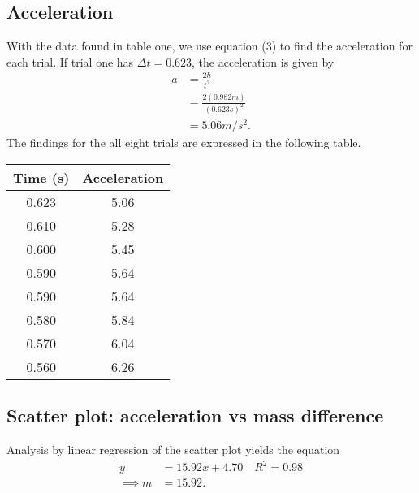 \documentclass{report}
\begin{document}
    \subsection{Acceleration}
    \bigbreak \noindent 
    With the data found in table one, we use equation (3) to find the acceleration for each trial. If trial one has $\Delta t = 0.623$, the acceleration is given by
    \begin{align*}
        a &= \frac{2h}{t^{2}} \\
        &=\frac{2(0.982m)}{(0.623s)^{2}} \\
        &=5.06m/s^{2}
    .\end{align*}
    \bigbreak \noindent 
    The findings for the all eight trials are expressed in the following table.
    \begin{center}
        \begin{tabular}{c|c}
            Time (s) & Acceleration \\
        \hline
            0.623  & 5.06\\
            0.610  & 5.28\\
            0.600  & 5.45\\
            0.590  & 5.64\\
            0.590  & 5.64\\
            0.580  & 5.84\\
            0.570  & 6.04\\
            0.560  & 6.26\\
        \end{tabular}
    \end{center}

    \bigbreak \noindent 
    \subsection{Scatter plot: acceleration vs mass difference}
    \bigbreak \noindent 
    Analysis by linear regression of the scatter plot yields the equation
    \begin{align*}
        y &= 15.92x + 4.70 \quad R^{2} = 0.98 \\
        \implies m &= 15.92
    .\end{align*}
    \bigbreak \noindent 
\end{document}
